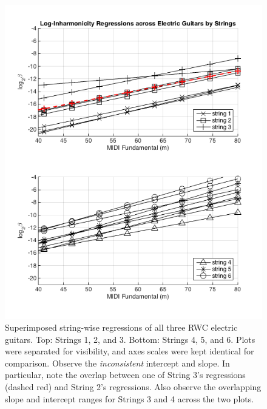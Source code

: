 \documentclass[12pt]{cmuthesis}
\begin{document}
\begin{figure}[!htbp] 
\centering
\includegraphics[scale=0.75]{traj-compare-eg}
\caption{Superimposed string-wise regressions of all three RWC electric guitars. Top: Strings 1, 2, and 3. Bottom: Strings 4, 5, and 6. Plots were separated for visibility, and axes scales were kept identical for comparison. Observe the \textit{inconsistent} intercept and slope. In particular, note the overlap between one of String 3's regressions (dashed red) and String 2's regressions. Also observe the overlapping slope and intercept ranges for Strings 3 and 4 across the two plots.}
\label{fig:eg-traj-comp}
\end{figure}
\end{document}
